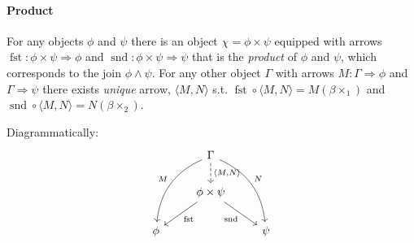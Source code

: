 \paragraph{Product} 
For any objects $\phi$ and $\psi$ there is an object $\chi=\phi\times \psi$ equipped with arrows $\operatorname{fst}:\phi\times\psi\Longrightarrow\phi$ and $\operatorname{snd}:\phi\times\psi\Longrightarrow\psi$ that is the \emph{product} of $\phi$ and $\psi$, which corresponds to the join $\phi\wedge \psi$. For any other object $\Gamma$ with arrows $M:\Gamma\Longrightarrow\phi$ and $\Gamma\Longrightarrow\psi$ there  exists \emph{unique} arrow, $\langle M,N \rangle$ s.t. $\operatorname{fst}\circ\langle M, N\rangle=M(\beta\times_1)$ and
$\operatorname{snd}\circ\langle M, N\rangle=N(\beta\times_2)$.
\begin{mdframed}
Diagrammatically:
\begin{equation*}
  \begin{tikzcd}
    {} & \Gamma \arrow[bend right]{ddl}[swap]{M} \arrow[bend left]{ddr}{N}\dar[dashed]{\langle M,N\rangle} & {} \\
    {} & \phi \times \psi \dlar{\text{fst}}\drar[swap]{\text{snd}} & {} \\
    \phi & {} & \psi
  \end{tikzcd}
\end{equation*}
\end{mdframed}




